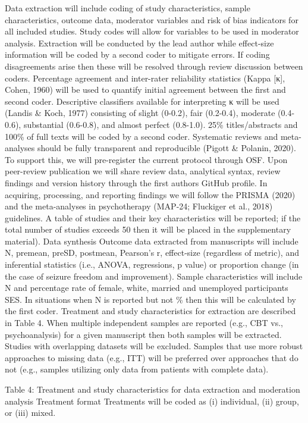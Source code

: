 \documentclass[
  12pt,
  openany]{book}
\begin{document}
Data extraction will include coding of study characteristics, sample characteristics, outcome data, moderator variables and risk of bias indicators for all included studies. Study codes will allow for variables to be used in moderator analysis. Extraction will be conducted by the lead author while effect-size information will be coded by a second coder to mitigate errors. If coding disagreements arise then these will be resolved through review discussion between coders. Percentage agreement and inter-rater reliability statistics (Kappa {[}κ{]}, Cohen, 1960) will be used to quantify initial agreement between the first and second coder. Descriptive classifiers available for interpreting κ will be used (Landis \& Koch, 1977) consisting of slight (0-0.2), fair (0.2-0.4), moderate (0.4-0.6), substantial (0.6-0.8), and almost perfect (0.8-1.0). 25\% titles/abstracts and 100\% of full texts will be coded by a second coder.
Systematic reviews and meta-analyses should be fully transparent and reproducible (Pigott \& Polanin, 2020). To support this, we will pre-register the current protocol through OSF. Upon peer-review publication we will share review data, analytical syntax, review findings and version history through the first authors GitHub profile. In acquiring, processing, and reporting findings we will follow the PRISMA (2020) and the meta-analyses in psychotherapy (MAP-24; Fluckiger et al., 2018) guidelines. A table of studies and their key characteristics will be reported; if the total number of studies exceeds 50 then it will be placed in the supplementary material).
Data synthesis
Outcome data extracted from manuscripts will include N, premean, preSD, postmean, Pearson's r, effect-size (regardless of metric), and inferential statistics (i.e., ANOVA, regressions, p value) or proportion change (in the case of seizure freedom and improvement). Sample characteristics will include N and percentage rate of female, white, married and unemployed participants SES. In situations when N is reported but not \% then this will be calculated by the first coder. Treatment and study characteristics for extraction are described in Table 4.
When multiple independent samples are reported (e.g., CBT vs., psychoanalysis) for a given manuscript then both samples will be extracted. Studies with overlapping datasets will be excluded. Samples that use more robust approaches to missing data (e.g., ITT) will be preferred over approaches that do not (e.g., samples utilizing only data from patients with complete data).

Table 4:
Treatment and study characteristics for data extraction and moderation analysis
Treatment format Treatments will be coded as (i) individual, (ii) group, or (iii) mixed.
\end{document}
